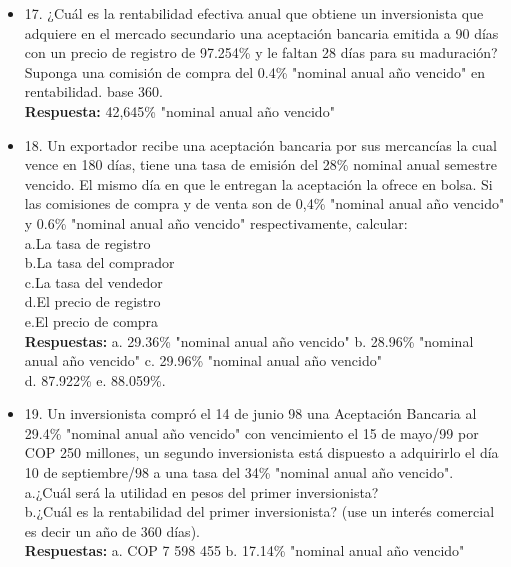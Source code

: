 \begin{itemize}
 \item 17. ¿Cuál es la rentabilidad efectiva anual que obtiene un inversionista que adquiere en el mercado secundario una aceptación bancaria emitida a 90 días con un precio de registro de 97.254\% y le faltan 28 días para su maduración? Suponga una comisión de compra del 0.4\% "nominal anual año vencido" en rentabilidad. base 360.\\
       \textbf{Respuesta:} 42,645\% "nominal anual año vencido"\\
       \medskip

 \item 18. Un exportador recibe una aceptación bancaria por sus mercancías la cual vence en 180 días, tiene una tasa de emisión del 28\% nominal anual semestre vencido. El mismo día en que le entregan la aceptación la ofrece en bolsa. Si las comisiones de compra y de venta son de 0,4\% "nominal anual año vencido" y 0.6\% "nominal anual año vencido" respectivamente, calcular:\\
       a.La tasa de registro\\
       b.La tasa del comprador\\
       c.La tasa del vendedor\\
       d.El precio de registro\\
       e.El precio de compra\\
       \textbf{Respuestas:} a. 29.36\% "nominal anual año vencido"\hspace{0,5cm} b. 28.96\% "nominal anual año vencido"\hspace{0,5cm}  c. 29.96\% "nominal anual año vencido"\hspace{0,5cm} \\
       d. 87.922\% \hspace{0,5cm} e. 88.059\%.\\
       \medskip

 \item 19. Un inversionista compró el 14 de junio 98 una Aceptación Bancaria al 29.4\% "nominal anual año vencido" con vencimiento el 15 de mayo/99 por COP 250 millones, un segundo inversionista está dispuesto a adquirirlo el día 10 de septiembre/98 a una tasa del 34\% "nominal anual año vencido".\\
       a.¿Cuál será la utilidad en pesos del primer inversionista?\\
       b.¿Cuál es la rentabilidad del primer inversionista? (use un interés comercial es decir un año de 360 días).\\
       \textbf{Respuestas:} a. COP 7 598 455\hspace{1.0cm} b. 17.14\% "nominal anual año vencido"\\
       \medskip


\end{itemize}
